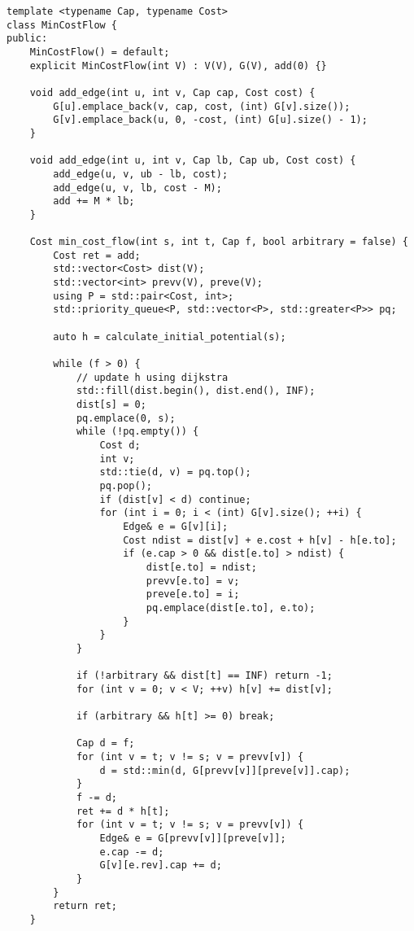\begin{lstlisting}
template <typename Cap, typename Cost>
class MinCostFlow {
public:
    MinCostFlow() = default;
    explicit MinCostFlow(int V) : V(V), G(V), add(0) {}

    void add_edge(int u, int v, Cap cap, Cost cost) {
        G[u].emplace_back(v, cap, cost, (int) G[v].size());
        G[v].emplace_back(u, 0, -cost, (int) G[u].size() - 1);
    }

    void add_edge(int u, int v, Cap lb, Cap ub, Cost cost) {
        add_edge(u, v, ub - lb, cost);
        add_edge(u, v, lb, cost - M);
        add += M * lb;
    }

    Cost min_cost_flow(int s, int t, Cap f, bool arbitrary = false) {
        Cost ret = add;
        std::vector<Cost> dist(V);
        std::vector<int> prevv(V), preve(V);
        using P = std::pair<Cost, int>;
        std::priority_queue<P, std::vector<P>, std::greater<P>> pq;

        auto h = calculate_initial_potential(s);

        while (f > 0) {
            // update h using dijkstra
            std::fill(dist.begin(), dist.end(), INF);
            dist[s] = 0;
            pq.emplace(0, s);
            while (!pq.empty()) {
                Cost d;
                int v;
                std::tie(d, v) = pq.top();
                pq.pop();
                if (dist[v] < d) continue;
                for (int i = 0; i < (int) G[v].size(); ++i) {
                    Edge& e = G[v][i];
                    Cost ndist = dist[v] + e.cost + h[v] - h[e.to];
                    if (e.cap > 0 && dist[e.to] > ndist) {
                        dist[e.to] = ndist;
                        prevv[e.to] = v;
                        preve[e.to] = i;
                        pq.emplace(dist[e.to], e.to);
                    }
                }
            }

            if (!arbitrary && dist[t] == INF) return -1;
            for (int v = 0; v < V; ++v) h[v] += dist[v];

            if (arbitrary && h[t] >= 0) break;

            Cap d = f;
            for (int v = t; v != s; v = prevv[v]) {
                d = std::min(d, G[prevv[v]][preve[v]].cap);
            }
            f -= d;
            ret += d * h[t];
            for (int v = t; v != s; v = prevv[v]) {
                Edge& e = G[prevv[v]][preve[v]];
                e.cap -= d;
                G[v][e.rev].cap += d;
            }
        }
        return ret;
    }


\end{lstlisting}
